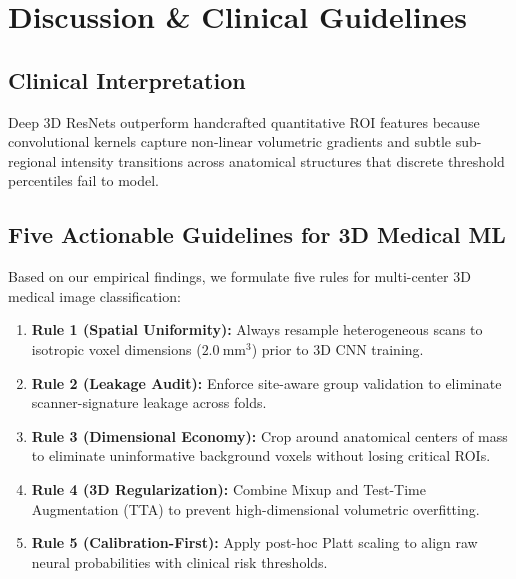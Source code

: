 \section{Discussion \& Clinical Guidelines}
\label{sec:discussion}

\subsection{Clinical Interpretation}
Deep 3D ResNets outperform handcrafted quantitative ROI features because convolutional kernels capture non-linear volumetric gradients and subtle sub-regional intensity transitions across anatomical structures that discrete threshold percentiles fail to model.

\subsection{Five Actionable Guidelines for 3D Medical ML}
Based on our empirical findings, we formulate five rules for multi-center 3D medical image classification:
\begin{enumerate}
    \item \textbf{Rule 1 (Spatial Uniformity):} Always resample heterogeneous scans to isotropic voxel dimensions ($2.0~\text{mm}^3$) prior to 3D CNN training.
    \item \textbf{Rule 2 (Leakage Audit):} Enforce site-aware group validation to eliminate scanner-signature leakage across folds.
    \item \textbf{Rule 3 (Dimensional Economy):} Crop around anatomical centers of mass to eliminate uninformative background voxels without losing critical ROIs.
    \item \textbf{Rule 4 (3D Regularization):} Combine Mixup and Test-Time Augmentation (TTA) to prevent high-dimensional volumetric overfitting.
    \item \textbf{Rule 5 (Calibration-First):} Apply post-hoc Platt scaling to align raw neural probabilities with clinical risk thresholds.
\end{enumerate}